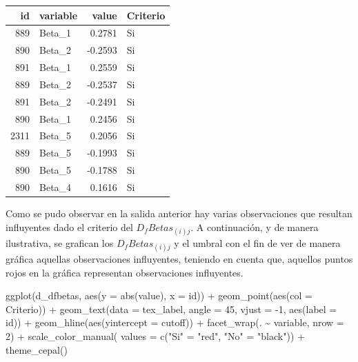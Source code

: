 \documentclass[
  12pt,
]{book}
\newenvironment{Shaded}{\begin{snugshade}}{\end{snugshade}}
\newcommand{\AttributeTok}[1]{\textcolor[rgb]{0.77,0.63,0.00}{#1}}
\newcommand{\DecValTok}[1]{\textcolor[rgb]{0.00,0.00,0.81}{#1}}
\newcommand{\FunctionTok}[1]{\textcolor[rgb]{0.00,0.00,0.00}{#1}}
\newcommand{\NormalTok}[1]{#1}
\newcommand{\OtherTok}[1]{\textcolor[rgb]{0.56,0.35,0.01}{#1}}
\newcommand{\SpecialCharTok}[1]{\textcolor[rgb]{0.00,0.00,0.00}{#1}}
\newcommand{\StringTok}[1]{\textcolor[rgb]{0.31,0.60,0.02}{#1}}
\begin{document}
\begin{tabular}{r|l|r|l}
\hline
id & variable & value & Criterio\\
\hline
889 & Beta\_1 & 0.2781 & Si\\
\hline
890 & Beta\_2 & -0.2593 & Si\\
\hline
891 & Beta\_1 & 0.2559 & Si\\
\hline
889 & Beta\_2 & -0.2537 & Si\\
\hline
891 & Beta\_2 & -0.2491 & Si\\
\hline
890 & Beta\_1 & 0.2456 & Si\\
\hline
2311 & Beta\_5 & 0.2056 & Si\\
\hline
889 & Beta\_5 & -0.1993 & Si\\
\hline
890 & Beta\_5 & -0.1788 & Si\\
\hline
890 & Beta\_4 & 0.1616 & Si\\
\hline
\end{tabular}

Como se pudo observar en la salida anterior hay varias observaciones que resultan influyentes dado el criterio del \(D_{f}Betas_{\left(i\right)j}\). A continuación, y de manera ilustrativa, se grafican los \(D_{f}Betas_{\left(i\right)j}\) y el umbral con el fin de ver de manera gráfica aquellas observaciones influyentes, teniendo en cuenta que, aquellos puntos rojos en la gráfica representan observaciones influyentes.

\begin{Shaded}
\begin{Highlighting}[]
\FunctionTok{ggplot}\NormalTok{(d\_dfbetas, }\FunctionTok{aes}\NormalTok{(}\AttributeTok{y =} \FunctionTok{abs}\NormalTok{(value), }\AttributeTok{x =}\NormalTok{ id)) }\SpecialCharTok{+}
  \FunctionTok{geom\_point}\NormalTok{(}\FunctionTok{aes}\NormalTok{(}\AttributeTok{col =}\NormalTok{ Criterio)) }\SpecialCharTok{+}
  \FunctionTok{geom\_text}\NormalTok{(}\AttributeTok{data =}\NormalTok{ tex\_label,}
            \AttributeTok{angle =} \DecValTok{45}\NormalTok{,}
            \AttributeTok{vjust =} \SpecialCharTok{{-}}\DecValTok{1}\NormalTok{,}
            \FunctionTok{aes}\NormalTok{(}\AttributeTok{label =}\NormalTok{ id)) }\SpecialCharTok{+}
  \FunctionTok{geom\_hline}\NormalTok{(}\FunctionTok{aes}\NormalTok{(}\AttributeTok{yintercept =}\NormalTok{ cutoff)) }\SpecialCharTok{+}
  \FunctionTok{facet\_wrap}\NormalTok{(. }\SpecialCharTok{\textasciitilde{}}\NormalTok{ variable, }\AttributeTok{nrow =} \DecValTok{2}\NormalTok{) }\SpecialCharTok{+}
  \FunctionTok{scale\_color\_manual}\NormalTok{(}
    \AttributeTok{values =} \FunctionTok{c}\NormalTok{(}\StringTok{"Si"} \OtherTok{=} \StringTok{"red"}\NormalTok{, }\StringTok{"No"} \OtherTok{=} \StringTok{"black"}\NormalTok{)) }\SpecialCharTok{+}
  \FunctionTok{theme\_cepal}\NormalTok{()}
\end{Highlighting}
\end{Shaded}
\end{document}

